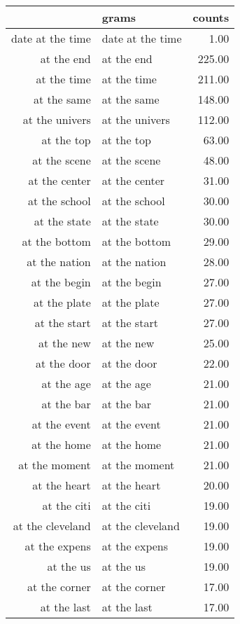 \begin{table}[ht]
\centering
\begin{tabular}{rlr}
  \hline
 & grams & counts \\ 
  \hline
date at the time & date at the time & 1.00 \\ 
  at the end & at the end & 225.00 \\ 
  at the time & at the time & 211.00 \\ 
  at the same & at the same & 148.00 \\ 
  at the univers & at the univers & 112.00 \\ 
  at the top & at the top & 63.00 \\ 
  at the scene & at the scene & 48.00 \\ 
  at the center & at the center & 31.00 \\ 
  at the school & at the school & 30.00 \\ 
  at the state & at the state & 30.00 \\ 
  at the bottom & at the bottom & 29.00 \\ 
  at the nation & at the nation & 28.00 \\ 
  at the begin & at the begin & 27.00 \\ 
  at the plate & at the plate & 27.00 \\ 
  at the start & at the start & 27.00 \\ 
  at the new & at the new & 25.00 \\ 
  at the door & at the door & 22.00 \\ 
  at the age & at the age & 21.00 \\ 
  at the bar & at the bar & 21.00 \\ 
  at the event & at the event & 21.00 \\ 
  at the home & at the home & 21.00 \\ 
  at the moment & at the moment & 21.00 \\ 
  at the heart & at the heart & 20.00 \\ 
  at the citi & at the citi & 19.00 \\ 
  at the cleveland & at the cleveland & 19.00 \\ 
  at the expens & at the expens & 19.00 \\ 
  at the us & at the us & 19.00 \\ 
  at the corner & at the corner & 17.00 \\ 
  at the last & at the last & 17.00 \\ 

\end{tabular}
\end{table}
